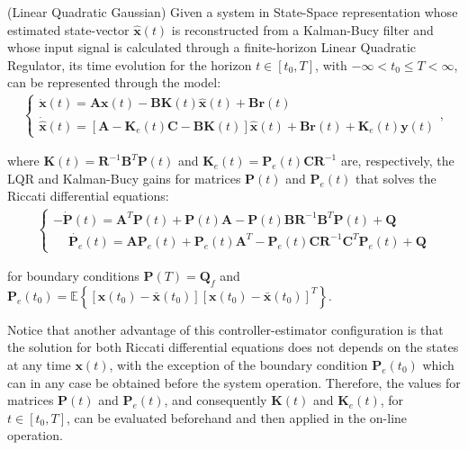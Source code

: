 \documentclass[a4paper,11pt]{book}
\numberwithin{figure}{chapter}
\numberwithin{equation}{chapter}
\numberwithin{table}{chapter}
\theoremstyle{definition}
\newtheorem{definition}{Definition}[chapter]
\newcounter{boxed-theorem}
\newcounter{boxed-definition}
\newenvironment{boxed-definition}[1]
{\begin{shaded} \begin{definition}{#1}}
{\end{definition} \end{shaded}}
\begin{document}
\begin{boxed-definition}{(Linear Quadratic Gaussian)} \label{def:lqg}
    Given a system in State-Space representation whose estimated state-vector $\hat{\bm{x}}(t)$ is reconstructed from a Kalman-Bucy filter and whose input signal is calculated through a finite-horizon Linear Quadratic Regulator, its time evolution for the horizon $t \in [t_0, T]$, with $-\infty < t_0 \leq T < \infty$, can be represented through the model:
    \begin{align} \label{eq:lqg01}
    \begin{cases}
        \dot{\bm{x}}(t) = \bm{A} \bm{x}(t) - \bm{B} \bm{K}(t) \hat{\bm{x}}(t) + \bm{B} \bm{r}(t) \\
        \dot{\hat{\bm{x}}}(t) = \left[\bm{A} - \bm{K}_e(t) \bm{C} - \bm{B} \bm{K}(t) \right] \hat{\bm{x}}(t) + \bm{B} \bm{r}(t) + \bm{K}_e(t) \bm{y}(t) 
    \end{cases}
    ,\end{align}
    
    \noindent where $\bm{K}(t) = \bm{R}^{-1}\bm{B}^T \bm{P}(t)$ and $\bm{K}_e(t) = \bm{P}_e(t) \bm{C} \bm{R}^{-1}$ are, respectively, the LQR and Kalman-Bucy gains for matrices $\bm{P}(t)$ and $\bm{P}_e(t)$ that solves the Riccati differential equations:
    \begin{align}
    \begin{cases}
        -\dot{\bm{P}}(t) = \bm{A}^T \bm{P}(t) + \bm{P}(t) \bm{A} - \bm{P}(t) \bm{B} \bm{R}^{-1} \bm{B}^T \bm{P}(t) + \bm{Q} \\
        \phantom{-} \dot{\bm{P}_e}(t) = \bm{A} \bm{P}_e(t) + \bm{P}_e(t) \bm{A}^T - \bm{P}_e(t)\bm{C}\bm{R}^{-1} \bm{C}^T \bm{P}_e(t) + \bm{Q}
    \end{cases}
    \end{align}
    
    \noindent for boundary conditions $\bm{P}(T) = \bm{Q}_f$ and $\bm{P}_e(t_0) = \mathbb{E} \left\{ [\bm{x}(t_0) - \bar{\bm{x}}(t_0)][\bm{x}(t_0) - \bar{\bm{x}}(t_0)]^T \right\}$.
\end{boxed-definition}

Notice that another advantage of this controller-estimator configuration is that the solution for both Riccati differential equations does not depends on the states at any time $\bm{x}(t)$, with the exception of the boundary condition $\bm{P}_e(t_0)$ which can in any case be obtained before the system operation. Therefore, the values for matrices $\bm{P}(t)$ and $\bm{P}_e(t)$, and consequently $\bm{K}(t)$ and $\bm{K}_e(t)$, for $t \in [t_0, T]$, can be evaluated beforehand and then applied in the on-line operation.
\end{document}
